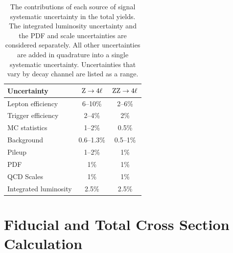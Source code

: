 \begin{table}[htbp]
  \centering
  \caption[Systematic uncertainties on the total yield]{
    The contributions of each source of signal systematic uncertainty in the total yields.
    The integrated luminosity uncertainty and the PDF and scale     uncertainties are considered separately.
    All other uncertainties are added in quadrature into a single systematic uncertainty.
    Uncertainties that vary by decay channel are listed as a range.
  }\label{tab:systematics}
  \begin{tabular}{lcc}
    \toprule
    Uncertainty               & $\mathrm{Z}  \to  4\ell$ & $\mathrm{Z}\mathrm{Z}  \to  4\ell$  \\
    \midrule
    Lepton efficiency         & 6--10\%           & 2--6\%             \\
    Trigger efficiency        & 2--4\%            & 2\%                \\
    MC statistics             & 1--2\%            & 0.5\%              \\
    Background                & 0.6--1.3\%        & 0.5--1\%           \\
    Pileup                    & 1--2\%            & 1\%                \\
    \midrule
    PDF                       & 1\%               & 1\%                \\
    QCD Scales                & 1\%               & 1\%                \\
    \midrule
    Integrated luminosity     & 2.5\%             & 2.5\%              \\
    \bottomrule
  \end{tabular}
\end{table}



\section{Fiducial and Total Cross Section Calculation}


